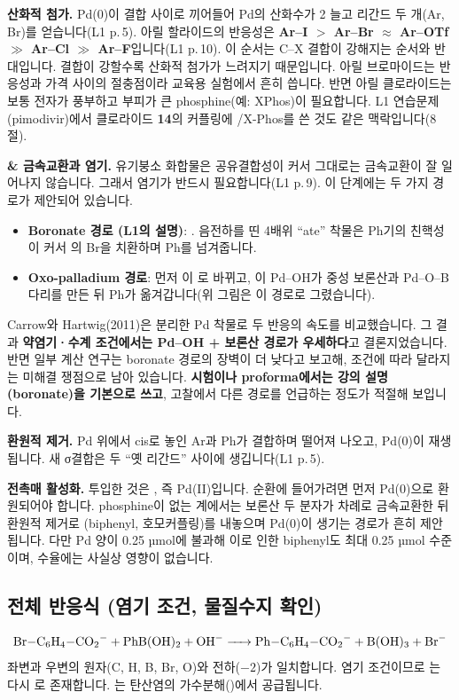 \documentclass[10pt,a4paper]{article}
\begin{document}
\textbf{ 산화적 첨가.} Pd(0)이  결합 사이로 끼어들어 Pd의 산화수가 2 늘고 리간드 두 개(Ar, Br)를 얻습니다(L1 p.\,5). 아릴 할라이드의 반응성은 \textbf{Ar--I $>$ Ar--Br $\approx$ Ar--OTf $\gg$ Ar--Cl $\gg$ Ar--F}입니다(L1 p.\,10). 이 순서는 C--X 결합이 강해지는 순서와 반대입니다. 결합이 강할수록 산화적 첨가가 느려지기 때문입니다. 아릴 브로마이드는 반응성과 가격 사이의 절충점이라 교육용 실험에서 흔히 씁니다. 반면 아릴 클로라이드는 보통 전자가 풍부하고 부피가 큰 phosphine(예: XPhos)이 필요합니다. L1 연습문제(pimodivir)에서 클로라이드 \textbf{14}의 커플링에 /X-Phos를 쓴 것도 같은 맥락입니다(8절).

\textbf{ \&  금속교환과 염기.} 유기붕소 화합물은 공유결합성이 커서 그대로는 금속교환이 잘 일어나지 않습니다. 그래서 염기가 반드시 필요합니다(L1 p.\,9). 이 단계에는 두 가지 경로가 제안되어 있습니다.
\begin{itemize}[leftmargin=5mm,itemsep=0.5mm,topsep=0.5mm]
\item \textbf{Boronate 경로 (L1의 설명)}: . 음전하를 띤 4배위 ``ate'' 착물은 Ph기의 친핵성이 커서 의 Br을 치환하며 Ph를 넘겨줍니다.
\item \textbf{Oxo-palladium 경로}: 먼저 이 로 바뀌고, 이 Pd--OH가 중성 보론산과 Pd--O--B 다리를 만든 뒤 Ph가 옮겨갑니다(위 그림은 이 경로로 그렸습니다).
\end{itemize}
Carrow와 Hartwig(2011)은 분리한 Pd 착물로 두 반응의 속도를 비교했습니다. 그 결과 \textbf{약염기·수계 조건에서는 Pd--OH + 보론산 경로가 우세하다}고 결론지었습니다. 반면 일부 계산 연구는 boronate 경로의 장벽이 더 낮다고 보고해, 조건에 따라 달라지는 미해결 쟁점으로 남아 있습니다. \textbf{시험이나 proforma에서는 강의 설명(boronate)을 기본으로 쓰고}, 고찰에서 다른 경로를 언급하는 정도가 적절해 보입니다.

\textbf{ 환원적 제거.} Pd 위에서 cis로 놓인 Ar과 Ph가 결합하며 떨어져 나오고, Pd(0)이 재생됩니다. 새 σ결합은 두 ``옛 리간드'' 사이에 생깁니다(L1 p.\,5).

\textbf{전촉매 활성화.} 투입한 것은 , 즉 Pd(II)입니다. 순환에 들어가려면 먼저 Pd(0)으로 환원되어야 합니다. phosphine이 없는 계에서는 보론산 두 분자가 차례로 금속교환한 뒤 환원적 제거로 (biphenyl, 호모커플링)를 내놓으며 Pd(0)이 생기는 경로가 흔히 제안됩니다. 다만 Pd 양이 0.25 µmol에 불과해 이로 인한 biphenyl도 최대 0.25 µmol 수준이며, 수율에는 사실상 영향이 없습니다.

\subsection*{전체 반응식 (염기 조건, 물질수지 확인)}
\[
\ce{Br-C6H4-CO2^- + PhB(OH)2 + OH^- -> Ph-C6H4-CO2^- + B(OH)3 + Br^-}
\]
{\small 좌변과 우변의 원자(C, H, B, Br, O)와 전하($-2$)가 일치합니다. 염기 조건이므로 는 다시 로 존재합니다. 는 탄산염의 가수분해()에서 공급됩니다.}
\end{document}
